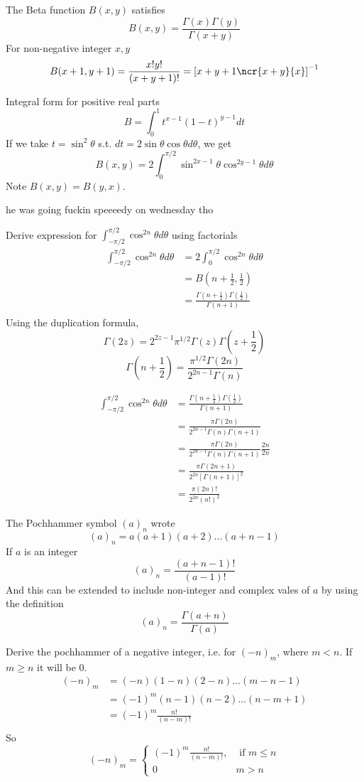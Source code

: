 \documentclass{E:/Documents/Latex/myassignment}
\begin{document}
The Beta function $B(x,y)$ satisfies
\[B(x,y) = \frac{\Gamma(x)\Gamma(y)}{\Gamma(x+y)}\]
For non-negative integer $x,y$
\[B(x+1,y+1) = \frac{x!y!}{(x+y+1)!} = \left[x+y+1 \ncr{x+y}{x}\right]^{-1}\]

Integral form for positive real parts
\[B = \int_0^1 t^{x-1} (1-t)^{y-1} dt\]
If we take $t = \sin^2\theta$ s.t. $dt = 2\sin\theta\cos\theta d\theta$, we get
\[B(x,y) = 2\int_0^{\pi/2} \sin^{2x-1}\theta \cos^{2y-1} \theta d \theta\]
Note $B(x,y) = B(y,x)$.

he was going fuckin speeeedy on wednesday tho 

Derive expression for $\int_{-\pi/2}^{\pi/2} \cos^{2n}\theta d\theta$ using factorials
\begin{align*}
	\int_{-\pi/2}^{\pi/2} \cos^{2n}\theta d\theta &=2\int_0^{\pi/2} \cos^{2n}\theta d\theta\\
	&= B(n+\frac12, \frac12)\\
	&=\frac{\Gamma(n+\frac12)\Gamma(\frac12)}{\Gamma(n+1)}\\
\end{align*}
Using the duplication formula,
\[\Gamma(2z) = 2^{2z-1} \pi^{1/2} \Gamma(z) \Gamma(z+\frac12)\]
\[\Gamma(n+\frac12) = \frac{\pi^{1/2} \Gamma(2n)}{2^{2n-1} \Gamma(n)}\]

\begin{align*}
	\int_{-\pi/2}^{\pi/2} \cos^{2n}\theta d\theta &=\frac{\Gamma(n+\frac12)\Gamma(\frac12)}{\Gamma(n+1)}\\
	&= \frac{\pi \Gamma(2n)}{2^{2n-1}\Gamma(n) \Gamma(n+1)}\\
	&= \frac{\pi \Gamma(2n)}{2^{2n-1}\Gamma(n) \Gamma(n+1)} \frac{2n}{2n}\\
	&= \frac{\pi \Gamma(2n+1)}{2^{2n} [\Gamma(n+1)]^2} \\
	&= \frac{\pi (2n)!}{2^{2n}(n!)^2}
\end{align*}

The Pochhammer symbol $(a)_n$ wrote
\[(a)_n = a(a+1)(a+2)\ldots(a+n-1)\]
If $a$ is an integer
\[(a)_n = \frac{(a+n-1)!}{(a-1)!}\]
And this can be extended to include non-integer and complex vales of $a$ by using the definition
\[(a)_n = \frac{\Gamma(a+n)}{\Gamma(a)}\]

Derive the pochhammer of a negative integer, i.e. for $(-n)_m$, where $m < n$.
If $m \geq n$ it will be $0$.
\begin{align*}
	(-n)_m &= (-n)(1-n)(2-n)\ldots(m-n-1)\\
		&=(-1)^m (n-1)(n-2)\ldots(n-m+1)\\
		&=(-1)^m \frac{n!}{(n-m)!}\\
\end{align*}
So
\[(-n)_m = \begin{cases}
	(-1)^m \frac{n!}{(n-m)!}, &\text{ if }m\leq n\\
	0&m > n
\end{cases} \]
\end{document}
